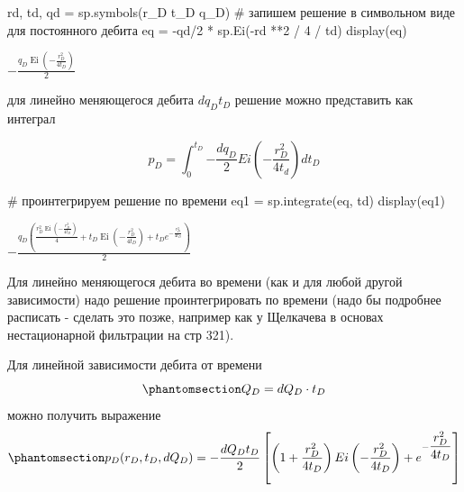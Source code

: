\documentclass[
  russian,
  letterpaper,
  DIV=11,
  numbers=noendperiod,
  oneside]{scrartcl}
\newenvironment{Shaded}{\begin{snugshade}}{\end{snugshade}}
\newcommand{\CommentTok}[1]{\textcolor[rgb]{0.37,0.37,0.37}{#1}}
\newcommand{\DecValTok}[1]{\textcolor[rgb]{0.68,0.00,0.00}{#1}}
\newcommand{\NormalTok}[1]{\textcolor[rgb]{0.00,0.23,0.31}{#1}}
\newcommand{\OperatorTok}[1]{\textcolor[rgb]{0.37,0.37,0.37}{#1}}
\newcommand{\StringTok}[1]{\textcolor[rgb]{0.13,0.47,0.30}{#1}}
\begin{document}
\begin{Shaded}
\begin{Highlighting}[]
\NormalTok{rd, td, qd }\OperatorTok{=}\NormalTok{ sp.symbols(}\StringTok{\textquotesingle{}r\_D t\_D q\_D\textquotesingle{}}\NormalTok{)}
\CommentTok{\# запишем решение в символьном виде для постоянного дебита}
\NormalTok{eq }\OperatorTok{=} \OperatorTok{{-}}\NormalTok{qd}\OperatorTok{/}\DecValTok{2} \OperatorTok{*}\NormalTok{ sp.Ei(}\OperatorTok{{-}}\NormalTok{rd }\OperatorTok{**}\DecValTok{2} \OperatorTok{/} \DecValTok{4} \OperatorTok{/}\NormalTok{ td)}
\NormalTok{display(eq)}
\end{Highlighting}
\end{Shaded}

$\displaystyle - \frac{q_{D} \operatorname{Ei}{\left(- \frac{r_{D}^{2}}{4 t_{D}} \right)}}{2}$

для линейно меняющегося дебита \(dq_D t_D\) решение можно представить
как интеграл

\[
p_D = \int_0^{t_D}{- \frac{dq_D}{2} Ei \left(- \dfrac{ r_D^2}{4t_d} \right) dt_D}
\]

\begin{Shaded}
\begin{Highlighting}[]
\CommentTok{\# проинтегрируем решение по времени}
\NormalTok{eq1 }\OperatorTok{=}\NormalTok{ sp.integrate(eq, td)}
\NormalTok{display(eq1)}
\end{Highlighting}
\end{Shaded}

$\displaystyle - \frac{q_{D} \left(\frac{r_{D}^{2} \operatorname{Ei}{\left(- \frac{r_{D}^{2}}{4 t_{D}} \right)}}{4} + t_{D} \operatorname{Ei}{\left(- \frac{r_{D}^{2}}{4 t_{D}} \right)} + t_{D} e^{- \frac{r_{D}^{2}}{4 t_{D}}}\right)}{2}$

Для линейно меняющегося дебита во времени (как и для любой другой
зависимости) надо решение проинтегрировать по времени (надо бы подробнее
расписать - сделать это позже, например как у Щелкачева в основах
нестационарной фильтрации на стр 321).

Для линейной зависимости дебита от времени
\begin{equation}\phantomsection\label{eq-qd_lin}{
Q_D = dQ_D \cdot t_D 
}\end{equation} можно получить выражение
\begin{equation}\phantomsection\label{eq-ei_sol_lin_rate}{
p_D(r_D,t_D, dQ_D) =-\frac{dQ_D t_D }{2} \left[ \left( 1+ \frac{r_D^2}{4 t_D} \right) Ei \left(- \dfrac{r_D^2}{4t_D} \right) + e^{-\dfrac{r_D^2}{4t_D}} \right]
}\end{equation}
\end{document}
